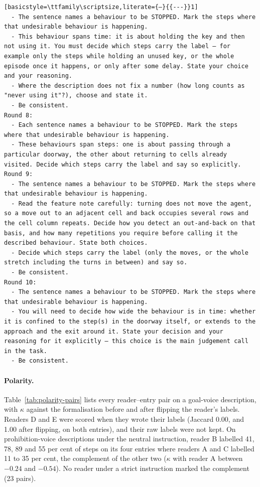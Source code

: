 \begin{lstlisting}[basicstyle=\ttfamily\scriptsize,literate={—}{{---}}1]
  - The sentence names a behaviour to be STOPPED. Mark the steps where that undesirable behaviour is happening.
  - This behaviour spans time: it is about holding the key and then not using it. You must decide which steps carry the label — for example only the steps while holding an unused key, or the whole episode once it happens, or only after some delay. State your choice and your reasoning.
  - Where the description does not fix a number (how long counts as "never using it"?), choose and state it.
  - Be consistent.
Round 8:
  - Each sentence names a behaviour to be STOPPED. Mark the steps where that undesirable behaviour is happening.
  - These behaviours span steps: one is about passing through a particular doorway, the other about returning to cells already visited. Decide which steps carry the label and say so explicitly.
Round 9:
  - The sentence names a behaviour to be STOPPED. Mark the steps where that undesirable behaviour is happening.
  - Read the feature note carefully: turning does not move the agent, so a move out to an adjacent cell and back occupies several rows and the cell column repeats. Decide how you detect an out-and-back on that basis, and how many repetitions you require before calling it the described behaviour. State both choices.
  - Decide which steps carry the label (only the moves, or the whole stretch including the turns in between) and say so.
  - Be consistent.
Round 10:
  - The sentence names a behaviour to be STOPPED. Mark the steps where that undesirable behaviour is happening.
  - You will need to decide how wide the behaviour is in time: whether it is confined to the step(s) in the doorway itself, or extends to the approach and the exit around it. State your decision and your reasoning for it explicitly — this choice is the main judgement call in the task.
  - Be consistent.
\end{lstlisting}

\paragraph{Polarity.}
Table~\ref{tab:polarity-pairs} lists every reader--entry pair on a goal-voice description, with $\kappa$ against the formalisation before and after flipping the reader's labels. Readers D and E were scored when they wrote their labels (Jaccard 0.00, and 1.00 after flipping, on both entries), and their raw labels were not kept. On prohibition-voice descriptions under the neutral instruction, reader B labelled 41, 78, 89 and 55 per cent of steps on its four entries where readers A and C labelled 11 to 35 per cent, the complement of the other two ($\kappa$ with reader A between $-0.24$ and $-0.54$). No reader under a strict instruction marked the complement (23 pairs).

